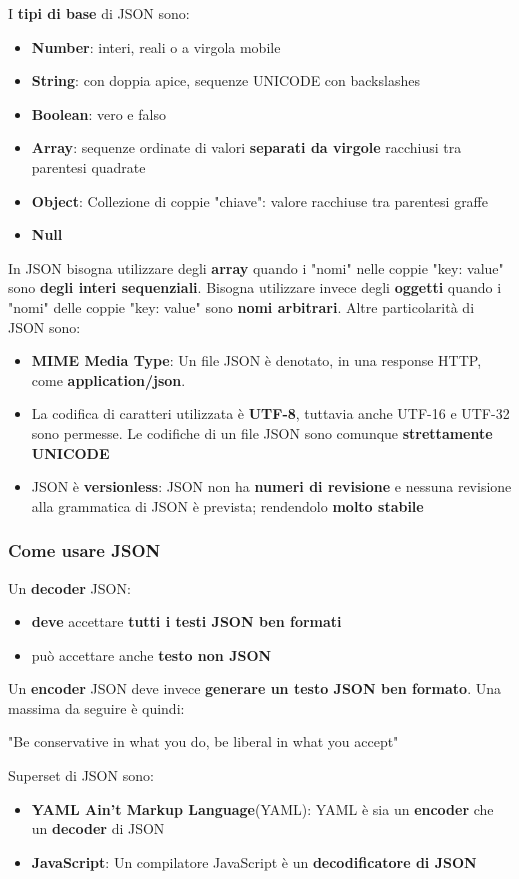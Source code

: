 \documentclass[12pt]{article}
\begin{document}
I \textbf{tipi di base} di JSON sono:
\begin{itemize}
    \item \textbf{Number}: interi, reali o a virgola mobile
    \item \textbf{String}: con doppia apice, sequenze UNICODE con backslashes
    \item \textbf{Boolean}: vero e falso
    \item \textbf{Array}: sequenze ordinate di valori \textbf{separati da virgole} racchiusi tra parentesi quadrate
    \item \textbf{Object}: Collezione di coppie "chiave": valore racchiuse tra parentesi graffe
    \item \textbf{Null}
\end{itemize}
In JSON bisogna utilizzare degli \textbf{array} quando i "nomi" nelle coppie "key: value" sono \textbf{degli interi sequenziali}.
Bisogna utilizzare invece degli \textbf{oggetti} quando i "nomi" delle coppie "key: value" sono \textbf{nomi arbitrari}.
Altre particolarità di JSON sono:
\begin{itemize}
    \item \textbf{MIME Media Type}: Un file JSON è denotato, in una response HTTP, come \textbf{application/json}.
    \item La codifica di caratteri utilizzata è \textbf{UTF-8}, tuttavia anche UTF-16 e UTF-32 sono permesse. Le codifiche di un file JSON sono comunque \textbf{strettamente UNICODE}
    \item JSON è \textbf{versionless}: JSON non ha \textbf{numeri di revisione} e nessuna revisione alla grammatica di JSON è prevista; rendendolo \textbf{molto stabile}
\end{itemize}
\subsubsection{Come usare JSON}
Un \textbf{decoder} JSON:
\begin{itemize}
    \item \textbf{deve} accettare \textbf{tutti i testi JSON ben formati}
    \item può accettare anche \textbf{testo non JSON}
\end{itemize}
Un \textbf{encoder} JSON deve invece \textbf{generare un testo JSON ben formato}. Una massima da seguire è quindi:
\begin{center}
    "Be conservative in what you do, be liberal in what you accept"
\end{center}
Superset di JSON sono:
\begin{itemize}
    \item \textbf{YAML Ain't Markup Language}(YAML): YAML è sia un \textbf{encoder} che un \textbf{decoder} di JSON
    \item \textbf{JavaScript}: Un compilatore JavaScript è un \textbf{decodificatore di JSON}
\end{itemize}
\end{document}
